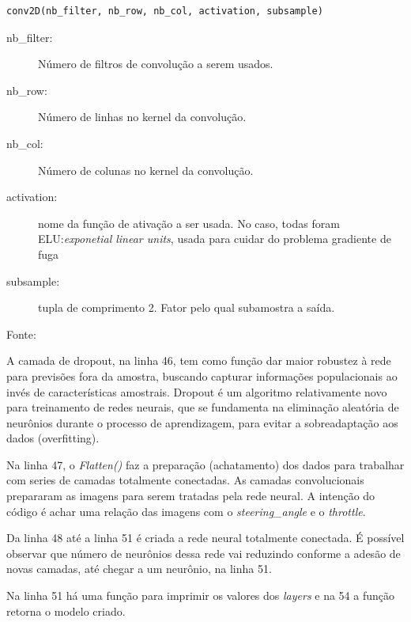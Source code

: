 \begin{lstlisting}
conv2D(nb_filter, nb_row, nb_col, activation, subsample)
\end{lstlisting}

\begin{description}
    \item[nb\_filter:] Número de filtros de convolução a serem usados.
    \item[nb\_row:] Número de linhas no kernel da convolução.
    \item[nb\_col:] Número de colunas no kernel da convolução.
    \item[activation:] nome da função de ativação a ser usada. No caso, todas foram ELU:\textit{exponetial linear units}, usada para cuidar do problema gradiente de fuga
    \item[subsample:] tupla de comprimento 2. Fator pelo qual subamostra a saída.
    \item[Fonte:] \cite{kerasconv}
\end{description}
A camada de dropout, na linha 46, tem como função dar maior robustez à rede para previsões fora da amostra, buscando capturar informações populacionais ao invés de características amostrais. 
Dropout é um algoritmo relativamente novo para treinamento de redes neurais, que se fundamenta na eliminação aleatória de neurônios durante o processo de aprendizagem, para evitar a sobreadaptação aos dados (overfitting).

Na linha 47, o \textit{Flatten()} faz a preparação (achatamento) dos dados para trabalhar com series de camadas totalmente conectadas. As camadas convolucionais prepararam as imagens para serem tratadas pela rede neural. A intenção do código é achar uma relação das imagens com o \textit{steering\_angle} e o \textit{throttle}.

Da linha 48 até a linha 51 é criada a rede neural totalmente conectada. É possível observar que número de neurônios dessa rede vai reduzindo conforme a adesão de novas camadas, até chegar a um neurônio, na linha 51. 

Na linha 51 há uma função para imprimir os valores dos \textit{layers} e na 54 a função retorna o modelo criado.

	\begin{figure}[H]
		\centering
\end{figure}

